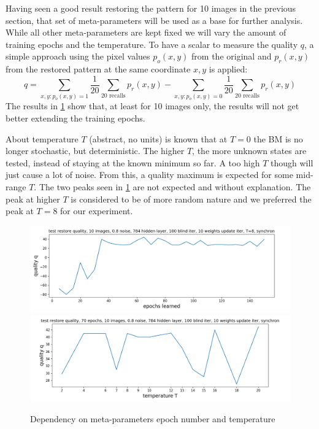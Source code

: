 \documentclass[12pt,twoside]{article}
\theoremstyle{plain}
\theoremstyle{definition}
\theoremstyle{remark}
\begin{document}
Having seen a good result restoring the pattern for 10 images in the previous section, that set of meta-parameters will be used as a base for further analysis. While all other meta-parameters are kept fixed we will vary the amount of training epochs and the temperature. To have a scalar to measure the quality $q$, a simple approach using the pixel values $p_o(x,y)$ from the original and $p_r(x, y)$ from the restored pattern at the same coordinate $x,y$ is applied:
$$q = \sum_{x, y : p_o(x, y) = 1} \frac1{20}\sum_{\text{20 recalls}}p_r(x, y) - \sum_{x, y : p_o(x, y) = 0} \frac1{20}\sum_{\text{20 recalls}}p_r(x, y)$$
The results in \cref{fig:test_vary_epoch_t} show that, at least for 10 images only, the results will not get better extending the training epochs.

About temperature $T$ (abstract, no units) is known that at $T=0$ the BM is no longer stochastic, but deterministic. The higher $T$, the more unknown states are tested, instead of staying at the known minimum so far. A too high $T$ though will just cause a lot of noise. From this, a quality maximum is expected for some mid-range $T$. The two peaks seen in \cref{fig:test_vary_epoch_t} are not expected and without explanation. The peak at higher $T$ is considered to be of more random nature and we preferred the peak at $T=8$ for our experiment.

\begin{figure}[h!]
	\begin{center}
	\includegraphics[trim={0cm 0cm 0cm 0cm},clip,width=\textwidth]{src/test_restore_quality_10_images_vary_epochs}
	\includegraphics[trim={0.4cm 0cm 0.8cm 0cm},clip,width=\textwidth]{src/test_restore_quality_10_images_vary_temperature}
	\end{center}
	\caption{Dependency on meta-parameters epoch number and temperature}\label{fig:test_vary_epoch_t}
\end{figure}
\end{document}
